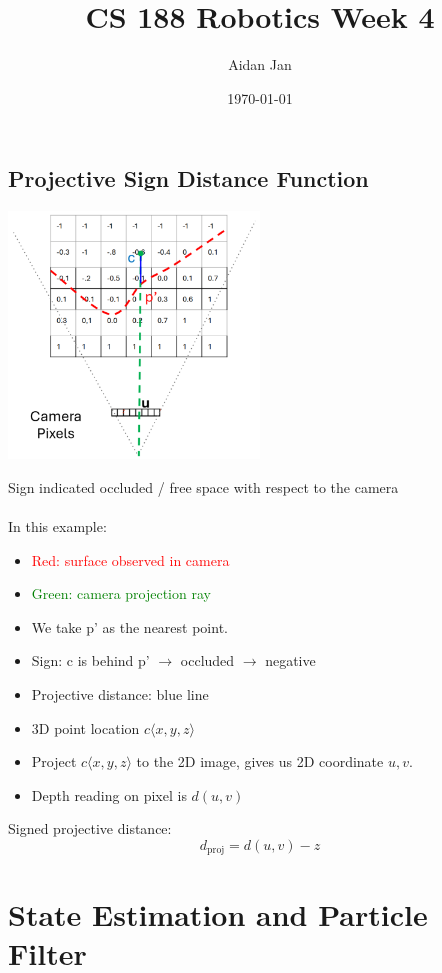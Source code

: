 \documentclass[10pt]{article}
\title{CS 188 Robotics Week 4}
\author{Aidan Jan}
\date{\today}
\begin{document}
\maketitle 

\subsection*{Projective Sign Distance Function}
\begin{center} 
	\includegraphics*[width=0.5\textwidth]{L1_1.png} 
\end{center}
Sign indicated occluded / free space with respect to the camera\\\\
In this example:
\begin{itemize}
	\item \textcolor{red}{Red: surface observed in camera}
	\item \textcolor{green}{Green: camera projection ray}
	\item We take p' as the nearest point.
	\item Sign: c is behind p' $\rightarrow$ occluded $\rightarrow$ negative
	\item Projective distance: blue line
	\item 3D point location $c\langle x, y, z \rangle$
	\item Project $c\langle x, y, z \rangle$ to the 2D image, gives us 2D coordinate $u, v$.
	\item Depth reading on pixel is $d(u, v)$
\end{itemize}
Signed projective distance:
\[d_{\text{proj}} = d(u, v) - z\]

\section*{State Estimation and Particle Filter}
\end{document}
